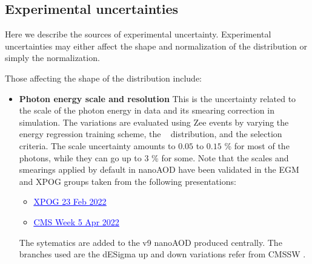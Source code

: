 \subsection{Experimental uncertainties}
Here we describe the sources of experimental uncertainty.
Experimental uncertainties may either affect the shape and normalization of the \mgg distribution or simply the normalization.

Those affecting the shape of the \mgg distribution include:
\begin{itemize}
    \item \textbf{Photon energy scale and resolution} This is the uncertainty related to the scale of the photon energy in data and its smearing correction \cite{Scales_AN} in simulation. The variations are evaluated using Zee events by varying the energy regression training scheme, the \RNINE~ distribution, and the selection criteria. The scale uncertainty amounts to $0.05$ to $0.15$ \% for most of the photons, while they can go up to $3$ \% for some.
    Note that the scales and smearings applied by default in nanoAOD have been validated in the EGM and XPOG groups taken from the following presentations:
\begin{itemize}
    \item \href{https://indico.cern.ch/event/1123547/contributions/4716514/attachments/2394644/4097503/CrossPOG_23Feb2022.pdf}{\textcolor{blue}{\underline{XPOG 23 Feb 2022}}}
    \item \href{https://indico.cern.ch/event/1095390/contributions/4799715/attachments/2421381/4144630/CMSweek_5Apr2022.pdf}{\textcolor{blue}{\underline{CMS Week 5 Apr 2022}}}
\end{itemize}
The sytematics are added to the v9 nanoAOD produced centrally. The branches used are the dESigma up and down variations refer from CMSSW \cite{CMSSW_smear}.
  \end{itemize}

